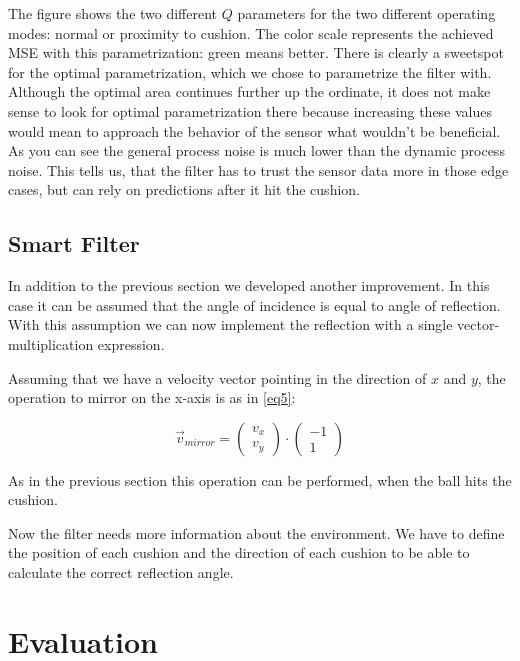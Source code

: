 \documentclass[titlepage, a4paper, 11pt]{scrartcl}
\begin{document}
The figure shows the two different $Q$ parameters for the two different operating modes: normal or proximity to cushion. 
The color scale represents the achieved MSE with this parametrization: green means better.
There is clearly a sweetspot for the optimal parametrization, which we chose to parametrize the filter with.
Although the optimal area continues further up the ordinate, it does not make sense to look for optimal parametrization there
because increasing these values would mean to approach the behavior of the sensor what wouldn't be beneficial.
As you can see the general process noise is much lower than the dynamic process noise.
This tells us, that the filter has to trust the sensor data more in those edge cases, but can rely on predictions after it hit the cushion.

\subsection{Smart Filter} \label{smart-filter}

In addition to the previous section we developed another improvement. In this case it can be assumed that the angle of incidence is equal to angle of reflection. 
With this assumption we can now implement the reflection with a single vector-multiplication expression. 

Assuming that we have a velocity vector pointing in the direction of $x$ and $y$, the operation to mirror on the x-axis is as in \cref{eq5}:

\begin{equation} 
    \label{eq5}
    \vec{v}_{mirror} = 
    \left(\!
    \begin{array}{c}
      v_x \\
      v_y
    \end{array}
    \!\right) \cdot
    \left(\!
    \begin{array}{c}
        -1 \\
        1
    \end{array}
    \!\right)
\end{equation}

As in the previous section this operation can be performed, when the ball hits the cushion.

Now the filter needs more information about the environment. We have to define the position of each cushion and the direction of each cushion to be able to calculate the correct reflection angle.

\section{Evaluation}
\end{document}
